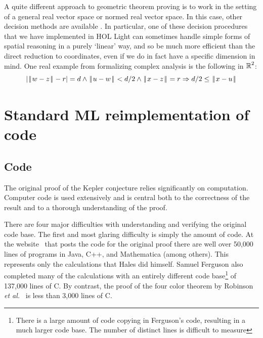 \documentclass[11pt]{amsart}
\def\|{{\hskip0.1em|\hskip-0.15em|\hskip0.1em}}
\newcommand{\real}{\mbox{$\protect\mathbb R$}}
\let\And=\wedge                    %
\newcommand{\Imp}{\Rightarrow}
\begin{document}
A quite different approach to geometric theorem proving is to work in the
setting of a general real vector space or normed real vector space. In this
case, other decision methods are available \cite{solovay-jointpaper}. In
particular, one of these decision procedures that we have implemented in HOL
Light can sometimes handle simple forms of spatial reasoning in a purely
`linear' way, and so be much more efficient than the direct reduction to
coordinates, even if we do in fact have a specific dimension in mind. One
real example from formalizing complex analysis is the following in $\real^2$:
$$ |\|w - z\| - r| = d \And \|u - w\| < d/2 \And \|x - z\| = r
   \Imp d/2 \leq \|x - u\|
$$

\section{Standard ML reimplementation of code}
\label{sec:code}

\subsection*{Code}

The original proof of the Kepler conjecture relies significantly on
computation. Computer code is used extensively and is central both to
the correctness of the result and to a thorough understanding of the
proof.

  There are four major difficulties with understanding and verifying
the original code base. The first and most glaring difficulty is
simply the amount of code. At the website~\cite{website:Hales:1998:Code}
that posts the code for the original proof
there are well over 50,000 lines of programs in Java, C++, and
Mathematica (among others). This represents only the calculations that Hales did himself.
Samuel Ferguson also completed many of the calculations with an entirely
different code base\footnote{There is a large amount of
code copying in Ferguson's code, resulting in a much larger code base.
The number of distinct lines is difficult to measure} of 137,000 lines of C. By
contrast, the proof of the four color theorem by Robinson \textit{et
al.}~\cite{Robertson:1997:JCTB} is less than 3,000 lines of C.
\end{document}
